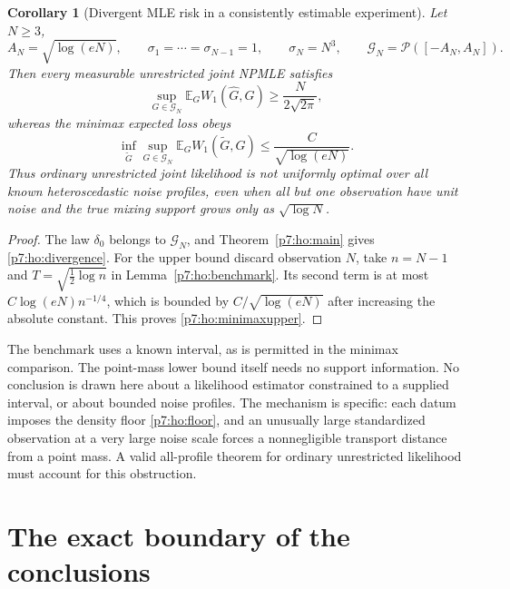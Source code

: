 \documentclass[11pt,a4paper]{article}
\newtheorem{corollary}[theorem]{Corollary}
\theoremstyle{definition}
\theoremstyle{remark}
\numberwithin{equation}{section}
\begin{document}
\begin{corollary}[Divergent MLE risk in a consistently estimable experiment]
\label{p7:ho:counterexample}
Let $N\ge3$,
\[
 A_N=\sqrt{\log(eN)},\qquad
 \sigma_1=\cdots=\sigma_{N-1}=1,\qquad \sigma_N=N^3,
 \qquad\mathcal G_N=\mathcal P([-A_N,A_N]).
\]
Then every measurable unrestricted joint NPMLE satisfies
\begin{equation}\label{p7:ho:divergence}
 \sup_{G\in\mathcal G_N}\mathbb E_G W_1(\widehat G,G)
       \ge \frac{N}{2\sqrt{2\pi}},
\end{equation}
whereas the minimax expected loss obeys
\begin{equation}\label{p7:ho:minimaxupper}
 \inf_{\widetilde G}\sup_{G\in\mathcal G_N}
       \mathbb E_G W_1(\widetilde G,G)
       \le\frac C{\sqrt{\log(eN)}}.
\end{equation}
Thus ordinary unrestricted joint likelihood is not uniformly optimal
over all known heteroscedastic noise profiles, even when all but one
observation have unit noise and the true mixing support grows only as
$\sqrt{\log N}$.
\end{corollary}

\begin{proof}
The law $\delta_0$ belongs to $\mathcal G_N$, and
Theorem~\ref{p7:ho:main} gives \eqref{p7:ho:divergence}.
For the upper bound discard observation $N$, take $n=N-1$ and
$T=\sqrt{\tfrac12\log n}$ in Lemma~\ref{p7:ho:benchmark}.  Its second
term is at most $C\log(eN)n^{-1/4}$, which is bounded by
$C/\sqrt{\log(eN)}$ after increasing the absolute constant.
This proves \eqref{p7:ho:minimaxupper}.
\end{proof}

The benchmark uses a known interval, as is permitted in the minimax
comparison.  The point-mass lower bound itself needs no support
information.  No conclusion is drawn here about a likelihood estimator
constrained to a supplied interval, or about bounded noise profiles.
The mechanism is specific: each datum imposes the density floor
\eqref{p7:ho:floor}, and an unusually large standardized observation at a
very large noise scale forces a nonnegligible transport distance from
a point mass.  A valid all-profile theorem for ordinary unrestricted
likelihood must account for this obstruction.


\clearpage

\section{The exact boundary of the conclusions}
\label{p7:scope:section}
\end{document}
